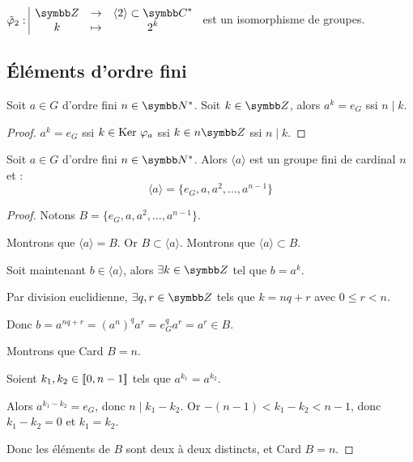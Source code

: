 \begin{exemple}
    $\fonction{\tilde \varphi_2}{\Z}{\langle 2 \rangle \subset \C^*}{k}{2^k}$ est un isomorphisme de groupes.

\end{exemple}

\subsection{Éléments d'ordre fini}

\begin{proposition}{}{}
    Soit $a \in G$ d'ordre fini $n \in \N^*$.
    Soit $k \in \Z$, alors
    $a^k = e_G$ ssi $n \mid k$.
\end{proposition}

\begin{proof}
    $a^k = e_G$ ssi $k \in \operatorname{Ker} \, \varphi_a$ ssi $k \in n \Z$ ssi $n \mid k$.
\end{proof}

\begin{proposition}{}{}
    Soit $a \in G$ d'ordre fini $n \in \N^*$.
    Alors $\langle a \rangle$ est un groupe fini de cardinal $n$ et :
    \[\langle a \rangle = \{e_G, a, a^2, \ldots, a^{n-1}\}\]
\end{proposition}


\begin{proof}
    Notons $B = \{e_G, a, a^2, \ldots, a^{n-1}\}$.

    Montrons que $\langle a \rangle = B$. 
    Or $B \subset \langle a \rangle$.
    Montrons que $\langle a \rangle \subset B$.

    Soit maintenant $b \in \langle a \rangle$, alors $\exists k \in \Z$ tel que $b = a^k$.

    Par division euclidienne, $\exists q, r \in \Z$ tels que $k = nq + r$ avec $0 \leqslant r < n$.

    Donc $b = a^{nq + r} = (a^n)^q a^r = e_G^q a^r = a^r \in B$.

    \avspace Montrons que Card $B = n$.

    Soient $k_1, k_2 \in [\![0, n-1]\!]$ tels que $a^{k_1} = a^{k_2}$.

    Alors $a^{k_1 - k_2} = e_G$, donc $n \mid k_1 - k_2$.
    Or $-(n-1) < k_1 - k_2 < n-1$, donc $k_1 - k_2 = 0$ et $k_1 = k_2$.

    Donc les éléments de $B$ sont deux à deux distincts, et Card $B = n$.
\end{proof}

